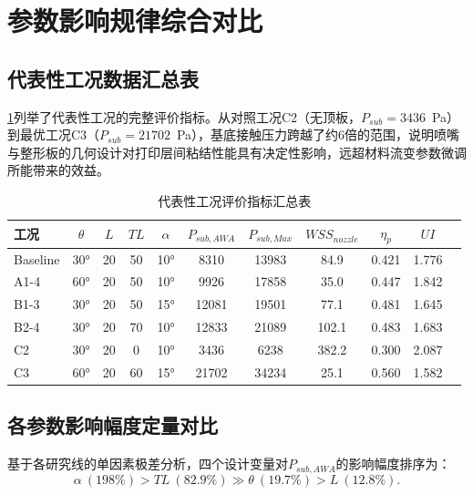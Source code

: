 \section{参数影响规律综合对比}

\subsection{代表性工况数据汇总表}

\cref{tab:4.9}列举了代表性工况的完整评价指标。从对照工况C2（无顶板，$P_{sub} = 3436$~Pa）到最优工况C3（$P_{sub} = 21702$~Pa），基底接触压力跨越了约6倍的范围，说明喷嘴与整形板的几何设计对打印层间粘结性能具有决定性影响，远超材料流变参数微调所能带来的效益。

\begin{table}[!htb]
  \centering
  \caption{代表性工况评价指标汇总表}\label{tab:4.9}
  \renewcommand{\arraystretch}{1.3}
  \footnotesize
  \begin{tabular}{lcccccccccc}
    \toprule
    \textbf{工况} & $\theta$ & $L$ & $TL$ & $\alpha$ & $P_{sub,AWA}$ & $P_{sub,Max}$ & $WSS_{nozzle}$ & $\eta_p$ & $UI$ \\
    \midrule
    Baseline & 30° & 20 & 50 & 10° & 8310  & 13983 & 84.9  & 0.421 & 1.776 \\
    A1-4     & 60° & 20 & 50 & 10° & 9926  & 17858 & 35.0  & 0.447 & 1.842 \\
    B1-3     & 30° & 20 & 50 & 15° & 12081 & 19501 & 77.1  & 0.481 & 1.645 \\
    B2-4     & 30° & 20 & 70 & 10° & 12833 & 21089 & 102.1 & 0.483 & 1.683 \\
    C2       & 30° & 20 & 0  & 10° & 3436  & 6238  & 382.2 & 0.300 & 2.087 \\
    C3       & 60° & 20 & 60 & 15° & 21702 & 34234 & 25.1  & 0.560 & 1.582 \\
    \bottomrule
  \end{tabular}
\end{table}

\subsection{各参数影响幅度定量对比}

基于各研究线的单因素极差分析，四个设计变量对$P_{sub,AWA}$的影响幅度排序为：
\begin{equation}\label{eq:rank}
  \alpha\ (198\%) > TL\ (82.9\%) \gg \theta\ (19.7\%) > L\ (12.8\%).
\end{equation}


